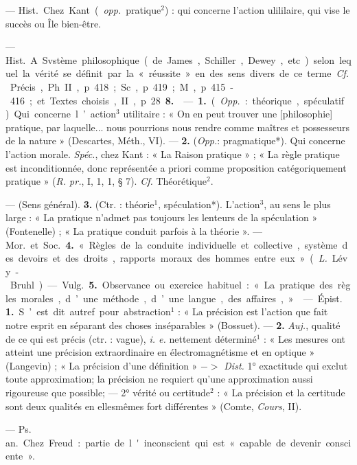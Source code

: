\begin{itemize}[leftmargin=1cm, label=, itemsep=1pt]
 — \si{Hist.} Chez Kant ({\it opp.}
pratique$^2$) : qui concerne l'action
ulililaire, qui vise le succès ou Île
bien-être.

 — \si{Hist.} A. Svstème
philosophique (de James, Schiller,
Dewey, etc.) selon lequel la vérité
se définit par la « réussite » en des
sens divers de ce terme. {\it Cf.} Précis,
Ph. II, p. 418; Sc., p. 419; M.,
p. 415-416; et Textes choisis, II,
p. 28 {\bf 8.}

 — {\bf 1.} ({\it Opp.} : théorique,
spéculatif). Qui concerne l’action$^3$
utilitaire : « On en peut trouver une
[philosophie] pratique, par laquelle...
nous pourrions nous rendre comme
maîtres et possesseurs de la nature »
(Descartes, Méth., VI). — {\bf 2.} ({\it Opp.}:
pragmatique*). Qui concerne l’action
morale. {\it Spéc.}, chez Kant : « La Raison
pratique » ; « La règle pratique est
inconditionnée, donc représentée a
priori comme proposition catégoriquement pratique » ({\it R. pr.}, I, 1,
1, § 7). {\it Cf.} Théorétique$^2$.

 — (Sens général).
 {\bf 3.} (Ctr. : théorie$^1$, spéculation*).
L'action$^3$, au sens le plus large : « La
pratique n’admet pas toujours les
lenteurs de la spéculation » (Fontenelle) ; « La pratique conduit parfois
à la théorie ». — \si{Mor.} et \si{Soc.} {\bf 4.}
« Règles de la conduite individuelle
et collective, système des devoirs et
des droits, rapports moraux des
hommes entre eux » ({\it L.} Lévy-Bruhl). — \si{Vulg.} {\bf 5.} Observance ou
exercice habituel : « La pratique
des règles morales, d’une méthode,
d’une langue, des affaires, »

 — \si{Épist.} {\bf 1.} S’est dit autref.
pour abstraction$^1$ : « La précision
est l’action que fait notre esprit en
séparant des choses inséparables »
(Bossuet). — {\bf 2.} {\it Auj.}, qualité de ce
qui est précis (ctr. : vague), {\it i. e.} nettement déterminé$^1$ : « Les mesures
ont atteint une précision extraordinaire en électromagnétisme et en
optique » (Langevin) ; « La précision
d'une définition » $->$ {\it Dist.}
1° exactitude qui exclut toute approximation; la précision ne requiert
qu’une approximation aussi rigoureuse que possible; — 2° vérité ou
certitude$^2$ : « La précision et la certitude sont deux qualités en ellesmêmes fort différentes » (Comte,
{\it Cours}, II).

 — \si{Ps. an.} Chez Freud :
partie de l'inconscient qui est « capable de devenir consciente ».


\end{itemize}
